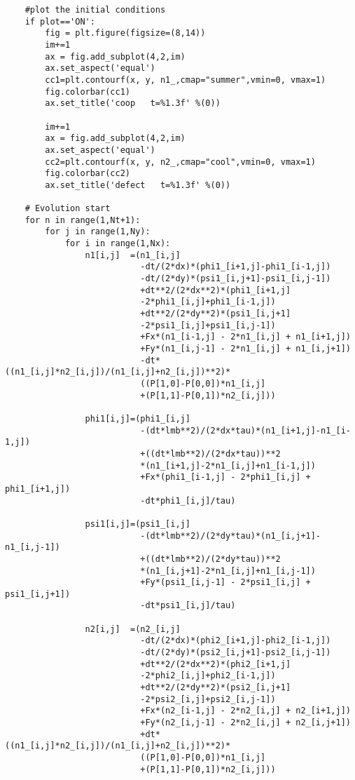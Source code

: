 \begin{lstlisting}
    #plot the initial conditions
    if plot=='ON':
        fig = plt.figure(figsize=(8,14))
        im+=1
        ax = fig.add_subplot(4,2,im)
        ax.set_aspect('equal')
        cc1=plt.contourf(x, y, n1_,cmap="summer",vmin=0, vmax=1)
        fig.colorbar(cc1)
        ax.set_title('coop   t=%1.3f' %(0))

        im+=1
        ax = fig.add_subplot(4,2,im)
        ax.set_aspect('equal')
        cc2=plt.contourf(x, y, n2_,cmap="cool",vmin=0, vmax=1)
        fig.colorbar(cc2)
        ax.set_title('defect   t=%1.3f' %(0))
    
    # Evolution start        
    for n in range(1,Nt+1):
        for j in range(1,Ny):
            for i in range(1,Nx):
                n1[i,j]  =(n1_[i,j]
                           -dt/(2*dx)*(phi1_[i+1,j]-phi1_[i-1,j])
                           -dt/(2*dy)*(psi1_[i,j+1]-psi1_[i,j-1])
                           +dt**2/(2*dx**2)*(phi1_[i+1,j]
						   -2*phi1_[i,j]+phi1_[i-1,j])
                           +dt**2/(2*dy**2)*(psi1_[i,j+1]
						   -2*psi1_[i,j]+psi1_[i,j-1])
                           +Fx*(n1_[i-1,j] - 2*n1_[i,j] + n1_[i+1,j])
                           +Fy*(n1_[i,j-1] - 2*n1_[i,j] + n1_[i,j+1])
                           -dt*((n1_[i,j]*n2_[i,j])/(n1_[i,j]+n2_[i,j])**2)*
                           ((P[1,0]-P[0,0])*n1_[i,j]
						   +(P[1,1]-P[0,1])*n2_[i,j]))
                
                phi1[i,j]=(phi1_[i,j]
                           -(dt*lmb**2)/(2*dx*tau)*(n1_[i+1,j]-n1_[i-1,j])
                           +((dt*lmb**2)/(2*dx*tau))**2
						   *(n1_[i+1,j]-2*n1_[i,j]+n1_[i-1,j])
                           +Fx*(phi1_[i-1,j] - 2*phi1_[i,j] + phi1_[i+1,j])
                           -dt*phi1_[i,j]/tau)
                
                psi1[i,j]=(psi1_[i,j]
                           -(dt*lmb**2)/(2*dy*tau)*(n1_[i,j+1]-n1_[i,j-1])
                           +((dt*lmb**2)/(2*dy*tau))**2
						   *(n1_[i,j+1]-2*n1_[i,j]+n1_[i,j-1])
                           +Fy*(psi1_[i,j-1] - 2*psi1_[i,j] + psi1_[i,j+1])
                           -dt*psi1_[i,j]/tau)

                n2[i,j]  =(n2_[i,j]
                           -dt/(2*dx)*(phi2_[i+1,j]-phi2_[i-1,j])
                           -dt/(2*dy)*(psi2_[i,j+1]-psi2_[i,j-1])
                           +dt**2/(2*dx**2)*(phi2_[i+1,j]
						   -2*phi2_[i,j]+phi2_[i-1,j])
                           +dt**2/(2*dy**2)*(psi2_[i,j+1]
						   -2*psi2_[i,j]+psi2_[i,j-1])
                           +Fx*(n2_[i-1,j] - 2*n2_[i,j] + n2_[i+1,j])
                           +Fy*(n2_[i,j-1] - 2*n2_[i,j] + n2_[i,j+1])
                           +dt*((n1_[i,j]*n2_[i,j])/(n1_[i,j]+n2_[i,j])**2)*
                           ((P[1,0]-P[0,0])*n1_[i,j]
						   +(P[1,1]-P[0,1])*n2_[i,j]))


\end{lstlisting}
